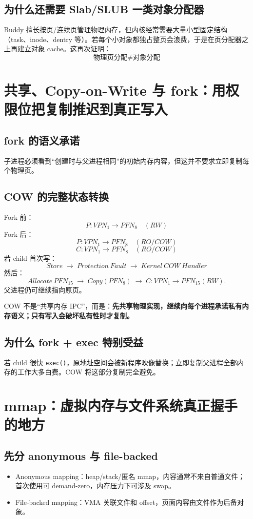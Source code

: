 \documentclass[11pt,a4paper]{ctexart}
\newcommand{\kw}[1]{\textbf{#1}}
\newcommand{\code}[1]{\texttt{#1}}
\newcommand{\arr}{\;\longrightarrow\;}
\begin{document}
\subsection{为什么还需要 Slab/SLUB 一类对象分配器}
Buddy 擅长按页/连续页管理物理内存，但内核经常需要大量小型固定结构（task、inode、dentry 等）。若每个小对象都独占整页会浪费，于是在页分配器之上再建立对象 cache。这再次证明：
\[
\boxed{\text{物理页分配} \neq \text{对象分配}}
\]

\section{共享、Copy-on-Write 与 fork：用权限位把复制推迟到真正写入}

\subsection{fork 的语义承诺}
子进程必须看到“创建时与父进程相同”的初始内存内容，但这并不要求立即复制每个物理页。

\subsection{COW 的完整状态转换}
Fork 前：
\[
P:VPN_1\to PFN_8\quad (RW)
\]
Fork 后：
\[
P:VPN_1\to PFN_8\quad (RO/COW)
\]
\[
C:VPN_1\to PFN_8\quad (RO/COW)
\]
若 child 首次写：
\[
Store\arr Protection\ Fault\arr Kernel\ COW\ Handler
\]
然后：
\[
Allocate\ PFN_{15}\arr Copy(PFN_8)\arr C:VPN_1\to PFN_{15}(RW).
\]
父进程仍可继续指向原页。

\begin{corebox}
COW 不是“共享内存 IPC”，而是：\kw{先共享物理实现，继续向每个进程承诺私有内存语义；只有写入会破坏私有性时才复制。}
\end{corebox}

\subsection{为什么 fork + exec 特别受益}
若 child 很快 \code{exec()}，原地址空间会被新程序映像替换；立即复制父进程全部内存的工作大多白费。COW 将这部分复制完全避免。

\section{mmap：虚拟内存与文件系统真正握手的地方}

\subsection{先分 anonymous 与 file-backed}
\begin{itemize}
  \item Anonymous mapping：heap/stack/匿名 mmap，内容通常不来自普通文件；首次使用可 demand-zero，内存压力下可涉及 swap。
  \item File-backed mapping：VMA 关联文件和 offset，页面内容由文件作为后备对象。
\end{itemize}
\end{document}
